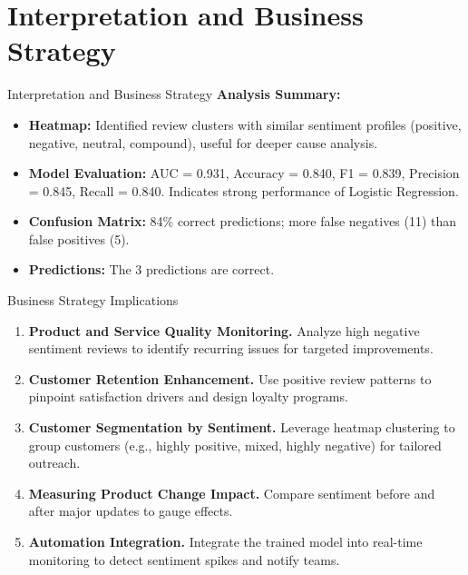 \documentclass[aspectratio=169, table]{beamer}
\begin{document}
\section{Interpretation and Business Strategy}
\begin{frame}{Interpretation and Business Strategy}
	\vspace{20pt}
	\textbf{Analysis Summary:}
	\begin{itemize}
		\item \textbf{Heatmap:} Identified review clusters with similar sentiment profiles (positive, negative, neutral, compound), useful for deeper cause analysis.
		\item \textbf{Model Evaluation:} AUC = 0.931, Accuracy = 0.840, F1 = 0.839, Precision = 0.845, Recall = 0.840. Indicates strong performance of Logistic Regression.
		\item \textbf{Confusion Matrix:} 84\% correct predictions; more false negatives (11) than false positives (5).
		\item \textbf{Predictions:} The 3 predictions are correct.
	\end{itemize}
\end{frame}

\begin{frame}{Business Strategy Implications}
	\vspace{20pt}
	\begin{enumerate}
		\item \textbf{Product and Service Quality Monitoring.} Analyze high negative sentiment reviews to identify recurring issues for targeted improvements.
		\item \textbf{Customer Retention Enhancement.} Use positive review patterns to pinpoint satisfaction drivers and design loyalty programs.
		\item \textbf{Customer Segmentation by Sentiment.} Leverage heatmap clustering to group customers (e.g., highly positive, mixed, highly negative) for tailored outreach.
		\item \textbf{Measuring Product Change Impact.} Compare sentiment before and after major updates to gauge effects.
		\item \textbf{Automation Integration.} Integrate the trained model into real-time monitoring to detect sentiment spikes and notify teams.
	\end{enumerate}
\end{frame}
\end{document}

